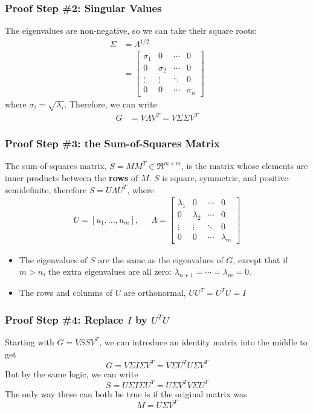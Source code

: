 \documentclass{beamer}
\begin{document}
\begin{frame}
  \frametitle{Proof Step \#2: Singular Values}

  The eigenvalues are non-negative, so we can take their square roots:
  \begin{align*}
    \Sigma &= \Lambda^{1/2}\\ 
    &=\left[\begin{array}{cccc}\sigma_1&0&\cdots&0\\
        0&\sigma_2&\cdots&0\\\vdots&\vdots&\ddots&0\\
        0&0&\cdots&\sigma_n
      \end{array}\right]
  \end{align*}
  where $\sigma_i=\sqrt{\lambda_i}$.  Therefore, we can write
  \begin{align*}
    G &= V\Lambda V^T = V\Sigma\Sigma V^T
  \end{align*}
\end{frame}

\begin{frame}
  \frametitle{Proof Step \#3: the Sum-of-Squares Matrix}
  The sum-of-squares matrix, $S=MM^T\in\Re^{m\times m}$, is the matrix whose
  elements are inner products between the {\bf rows} of $M$.  $S$
  is square, symmetric, and positive-semidefinite, therefore
  $S=U\Lambda U^T$, where
  \begin{align*}
    U=\left[u_1,\ldots,u_m\right],~~~
    &\Lambda=\left[\begin{array}{cccc}\lambda_1&0&\cdots&0\\
        0&\lambda_2&\cdots&0\\\vdots&\vdots&\ddots&0\\
        0&0&\cdots&\lambda_m
      \end{array}\right]
  \end{align*}
  \begin{itemize}
  \item The eigenvalues of $S$ are the same as the eigenvalues of $G$, except that
    if $m>n$, the extra eigenvalues are all zero: $\lambda_{n+1}=\cdots=\lambda_m=0$.
  \item The rows and columns of $U$ are orthonormal, $UU^T=U^TU=I$
  \end{itemize}
\end{frame}

\begin{frame}
  \frametitle{Proof Step \#4: Replace $I$ by $U^TU$}

  Starting with $G=VSSV^T$, we can introduce an identity matrix into
  the middle to get
  \begin{displaymath}
    G = V\Sigma I\Sigma V^T = V\Sigma U^TU\Sigma V^T
  \end{displaymath}
  But by the same logic, we can write
  \begin{displaymath}
    S = U\Sigma I\Sigma U^T = U\Sigma V^TV\Sigma U^T
  \end{displaymath}
  The only way these can both be true is if the original matrix was
  \begin{displaymath}
    M = U\Sigma V^T
  \end{displaymath}
\end{frame}
\end{document}
